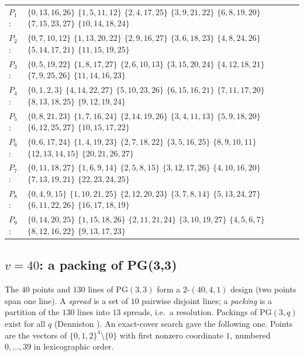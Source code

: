\documentclass[11pt]{article}
\theoremstyle{definition}
\theoremstyle{remark}
\begin{document}
\begin{center}\small
\begin{tabular}{@{}ll@{}}
$P_{1}$: & $\{0,13,16,26\}$ $\{1,5,11,12\}$ $\{2,4,17,25\}$ $\{3,9,21,22\}$ $\{6,8,19,20\}$ $\{7,15,23,27\}$ $\{10,14,18,24\}$\\
$P_{2}$: & $\{0,7,10,12\}$ $\{1,13,20,22\}$ $\{2,9,16,27\}$ $\{3,6,18,23\}$ $\{4,8,24,26\}$ $\{5,14,17,21\}$ $\{11,15,19,25\}$\\
$P_{3}$: & $\{0,5,19,22\}$ $\{1,8,17,27\}$ $\{2,6,10,13\}$ $\{3,15,20,24\}$ $\{4,12,18,21\}$ $\{7,9,25,26\}$ $\{11,14,16,23\}$\\
$P_{4}$: & $\{0,1,2,3\}$ $\{4,14,22,27\}$ $\{5,10,23,26\}$ $\{6,15,16,21\}$ $\{7,11,17,20\}$ $\{8,13,18,25\}$ $\{9,12,19,24\}$\\
$P_{5}$: & $\{0,8,21,23\}$ $\{1,7,16,24\}$ $\{2,14,19,26\}$ $\{3,4,11,13\}$ $\{5,9,18,20\}$ $\{6,12,25,27\}$ $\{10,15,17,22\}$\\
$P_{6}$: & $\{0,6,17,24\}$ $\{1,4,19,23\}$ $\{2,7,18,22\}$ $\{3,5,16,25\}$ $\{8,9,10,11\}$ $\{12,13,14,15\}$ $\{20,21,26,27\}$\\
$P_{7}$: & $\{0,11,18,27\}$ $\{1,6,9,14\}$ $\{2,5,8,15\}$ $\{3,12,17,26\}$ $\{4,10,16,20\}$ $\{7,13,19,21\}$ $\{22,23,24,25\}$\\
$P_{8}$: & $\{0,4,9,15\}$ $\{1,10,21,25\}$ $\{2,12,20,23\}$ $\{3,7,8,14\}$ $\{5,13,24,27\}$ $\{6,11,22,26\}$ $\{16,17,18,19\}$\\
$P_{9}$: & $\{0,14,20,25\}$ $\{1,15,18,26\}$ $\{2,11,21,24\}$ $\{3,10,19,27\}$ $\{4,5,6,7\}$ $\{8,12,16,22\}$ $\{9,13,17,23\}$\\
\end{tabular}
\end{center}

\subsection{\texorpdfstring{$v=40$}{v=40}: a packing of PG(3,3)}
The $40$ points and $130$ lines of $\mathrm{PG}(3,3)$ form a $2$-$(40,4,1)$ design (two
points span one line). A \emph{spread} is a set of $10$ pairwise disjoint lines; a
\emph{packing} is a partition of the $130$ lines into $13$ spreads, i.e.\ a resolution.
Packings of $\mathrm{PG}(3,q)$ exist for all $q$ (Denniston \cite{den}). An exact-cover search
gave the following one. Points are the vectors of $\{0,1,2\}^4\setminus\{0\}$ with first
nonzero coordinate $1$, numbered $0,\dots,39$ in lexicographic order.
\end{document}

